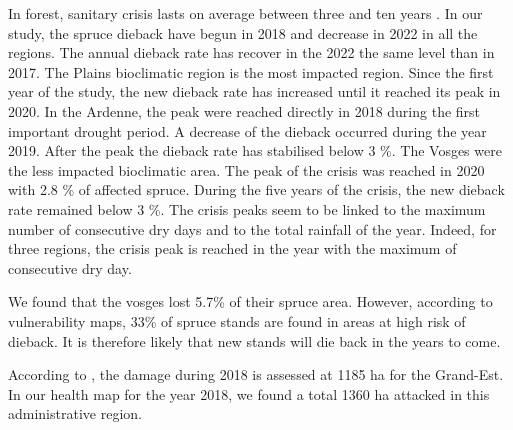 \documentclass[3p,procedia]{elsarticle}
\begin{document}
In forest, sanitary crisis lasts on average between three and ten years \citep{brunier_guide_2020}.
In our study, the spruce dieback have begun in 2018 and decrease in 2022 in all the regions.
The annual dieback rate has recover in the 2022 the same level than in 2017.
The Plains bioclimatic region is the most impacted region.
Since the first year of the study, the new dieback rate has increased until it reached its peak in 2020.
In the Ardenne, the peak were reached directly in 2018 during the first important drought period.   
A decrease of the dieback occurred during the year 2019.
After the peak the dieback rate has stabilised below 3 \%.
The Vosges were the less impacted bioclimatic area. 
The peak of the crisis was reached in 2020 with 2.8 \% of affected spruce.
During the five years of the crisis, the new dieback rate remained below 3 \%.
The crisis peaks seem to be linked to the maximum number of consecutive dry days  and to the total rainfall of the year. Indeed, for three regions, the crisis peak is reached in the year with the maximum of consecutive dry day.
  

We found that the vosges lost 5.7\% of their spruce area. However, according to \citep{piedallu_spatial_2022} vulnerability maps, 33\% of spruce stands are found in areas at high risk of dieback. It is therefore likely that new stands will die back in the years to come.


According to \citep{nardi_drought_2022}, the damage during 2018 is assessed at 1185 ha for the Grand-Est. In our health map for the year 2018, we found a total 1360 ha attacked in this administrative region. 
\end{document}

